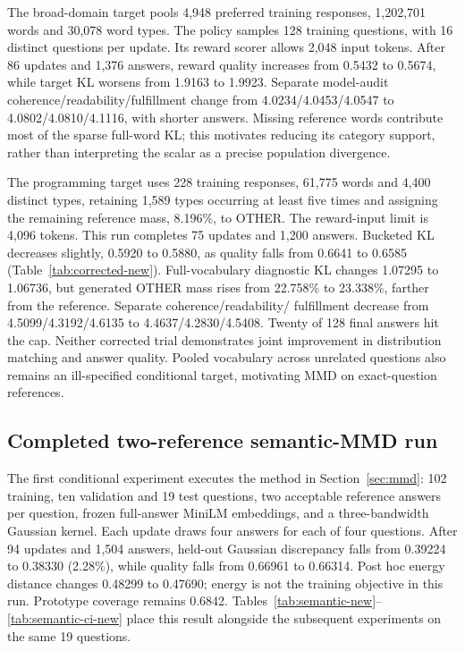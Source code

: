 The broad-domain target pools 4,948 preferred training responses,
1,202,701 words and 30,078 word types. The policy samples 128 training
questions, with 16 distinct questions per update. Its reward scorer
allows 2,048 input tokens. After 86 updates and 1,376 answers, reward
quality increases from 0.5432 to 0.5674, while target KL worsens from
1.9163 to 1.9923. Separate model-audit coherence/readability/fulfillment
change from 4.0234/4.0453/4.0547 to 4.0802/4.0810/4.1116, with shorter
answers. Missing reference words contribute most of the sparse full-word
KL; this motivates reducing its category support, rather than interpreting
the scalar as a precise population divergence.

The programming target uses 228 training responses, 61,775 words and
4,400 distinct types, retaining 1,589 types occurring at least five
times and assigning the remaining reference mass, 8.196\%, to OTHER.
The reward-input limit is 4,096 tokens. This run completes 75 updates
and 1,200 answers. Bucketed KL decreases slightly, 0.5920 to 0.5880,
as quality falls from 0.6641 to 0.6585
(Table~\ref{tab:corrected-new}). Full-vocabulary diagnostic KL changes
1.07295 to 1.06736, but generated OTHER mass rises from 22.758\% to
23.338\%, farther from the reference. Separate coherence/readability/
fulfillment decrease from 4.5099/4.3192/4.6135 to
4.4637/4.2830/4.5408. Twenty of 128 final answers hit the cap.
Neither corrected trial demonstrates joint improvement in distribution
matching and answer quality. Pooled vocabulary across unrelated questions
also remains an ill-specified conditional target, motivating MMD on
exact-question references.

\FloatBarrier

\subsection{Completed two-reference semantic-MMD run}
The first conditional experiment executes the method in
Section~\ref{sec:mmd}: 102 training, ten validation and 19 test questions,
two acceptable reference answers per question, frozen full-answer
MiniLM embeddings, and a three-bandwidth Gaussian kernel. Each update
draws four answers for each of four questions. After 94 updates and
1,504 answers, held-out Gaussian discrepancy falls from 0.39224 to
0.38330 (2.28\%), while quality falls from 0.66961 to 0.66314.
Post hoc energy distance changes 0.48299 to 0.47690; energy is not the
training objective in this run. Prototype coverage remains 0.6842.
Tables~\ref{tab:semantic-new}--\ref{tab:semantic-ci-new} place this
result alongside the subsequent experiments on the same 19 questions.

